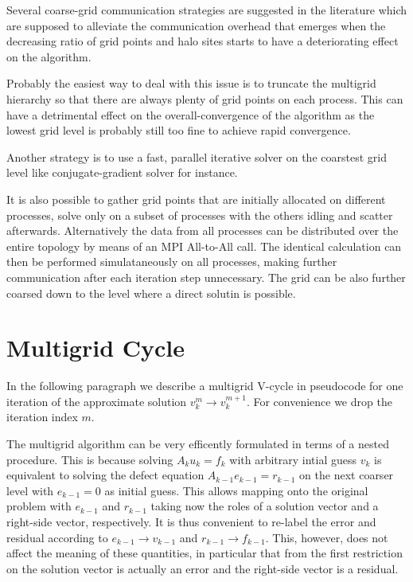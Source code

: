 \documentclass[11pt, oneside, a4paper]{article}
\begin{document}
Several coarse-grid communication strategies are suggested in the literature which are supposed to alleviate the communication overhead that emerges when the decreasing ratio of grid points and halo sites starts to have a deteriorating effect on the algorithm. 

Probably the easiest way to deal with this issue is to truncate the multigrid hierarchy so that there are always plenty of grid points on each process. This can have a detrimental effect on the overall-convergence of the algorithm as the lowest grid level is probably still too fine to achieve rapid convergence.

Another strategy is to use a fast, parallel iterative solver on the coarstest grid level like conjugate-gradient solver for instance. 

It is also possible to gather grid points that are initially allocated on different processes, solve only on a subset of processes with the others idling and scatter afterwards. Alternatively the data from all processes can be distributed over the entire topology by means of an MPI All-to-All call. The identical calculation can then be performed simulataneously on all processes, making further communication after each iteration step unnecessary. The grid can be also further coarsed down to the level where a direct solutin is possible.


\section{Multigrid Cycle}

In the following paragraph we describe a multigrid V-cycle in pseudocode for one iteration of the approximate solution $v_k^m\rightarrow v_k^{m+1}$. For convenience we drop the iteration index $m$.

The multigrid algorithm can be very efficently formulated in terms of a nested procedure. This is because solving $A_k u_k = f_k$ with arbitrary intial guess $v_k$ is equivalent to solving the defect equation $A_{k-1} e_{k-1} = r_{k-1}$ on the next coarser level with $e_{k-1}=0$ as initial guess. This allows mapping onto the original problem with $e_{k-1}$ and $r_{k-1}$ taking now the roles of a solution vector and a right-side vector, respectively. It is thus convenient to re-label the error and residual according to $e_{k-1}\rightarrow v_{k-1}$ and $r_{k-1}\rightarrow f_{k-1}$. This, however, does not affect the meaning of these quantities, in particular that from the first restriction on the solution vector is actually an error and the right-side vector is a residual. 
 
\end{document}

